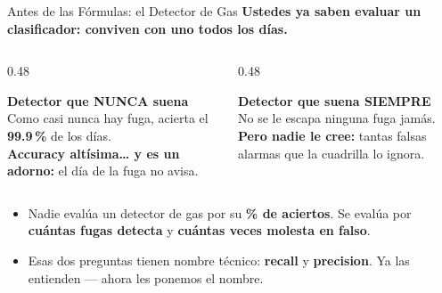 \documentclass[aspectratio=169, 11pt]{beamer}
\begin{document}
\begin{frame}[shrink=8]{Antes de las Fórmulas: el Detector de Gas}
  \vspace{-4pt}
  {\small\color{arcaDark}\bfseries
    Ustedes ya saben evaluar un clasificador: conviven con uno todos los días.}

  \vspace{6pt}
  \begin{columns}[T]
    \begin{column}{0.48\textwidth}
      \begin{tcolorbox}[colback=arcaGray, colframe=arcaRed, boxrule=0pt, leftrule=3pt,
        arc=3pt, left=6pt, right=6pt, top=5pt, bottom=5pt]
        {\scriptsize\color{arcaRed}\bfseries Detector que NUNCA suena}\\[4pt]
        {\scriptsize\color{textMuted}
          Como casi nunca hay fuga, acierta el
          \textbf{99.9\,\%} de los días.\\[4pt]
          \textbf{Accuracy altísima\ldots{} y es un adorno:}
          el día de la fuga no avisa.}
      \end{tcolorbox}
    \end{column}
    \begin{column}{0.48\textwidth}
      \begin{tcolorbox}[colback=arcaGray, colframe=codeOrange, boxrule=0pt, leftrule=3pt,
        arc=3pt, left=6pt, right=6pt, top=5pt, bottom=5pt]
        {\scriptsize\color{codeOrange}\bfseries Detector que suena SIEMPRE}\\[4pt]
        {\scriptsize\color{textMuted}
          No se le escapa ninguna fuga jamás.\\[4pt]
          \textbf{Pero nadie le cree:} tantas falsas
          alarmas que la cuadrilla lo ignora.}
      \end{tcolorbox}
    \end{column}
  \end{columns}

  \vspace{8pt}
  {\footnotesize\color{textMuted}
  \begin{itemize}\setlength{\itemsep}{4pt}
    \item[{\color{arcaRed}\scriptsize\faArrowRight}]
      Nadie evalúa un detector de gas por su \textbf{\% de aciertos}. Se evalúa por
      \textbf{cuántas fugas detecta} y \textbf{cuántas veces molesta en falso}.
    \item[{\color{codeGreen}\scriptsize\faCheck}]
      Esas dos preguntas tienen nombre técnico: \textbf{recall} y \textbf{precision}.
      Ya las entienden --- ahora les ponemos el nombre.
  \end{itemize}
  }
\end{frame}
\end{document}

